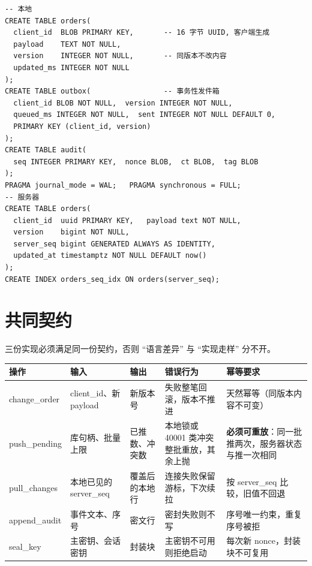 \documentclass[12pt,a4paper,fontset=fandol]{ctexbook}
\begin{document}
\begin{lstlisting}[style=sqlstyle,caption={共享表结构：本地 SQLite 与服务器 PostgreSQL}]
-- 本地
CREATE TABLE orders(
  client_id  BLOB PRIMARY KEY,       -- 16 字节 UUID, 客户端生成
  payload    TEXT NOT NULL,
  version    INTEGER NOT NULL,       -- 同版本不改内容
  updated_ms INTEGER NOT NULL
);
CREATE TABLE outbox(                 -- 事务性发件箱
  client_id BLOB NOT NULL,  version INTEGER NOT NULL,
  queued_ms INTEGER NOT NULL,  sent INTEGER NOT NULL DEFAULT 0,
  PRIMARY KEY (client_id, version)
);
CREATE TABLE audit(
  seq INTEGER PRIMARY KEY,  nonce BLOB,  ct BLOB,  tag BLOB
);
PRAGMA journal_mode = WAL;   PRAGMA synchronous = FULL;
-- 服务器
CREATE TABLE orders(
  client_id  uuid PRIMARY KEY,   payload text NOT NULL,
  version    bigint NOT NULL,
  server_seq bigint GENERATED ALWAYS AS IDENTITY,
  updated_at timestamptz NOT NULL DEFAULT now()
);
CREATE INDEX orders_seq_idx ON orders(server_seq);
\end{lstlisting}

\section{共同契约}

三份实现必须满足同一份契约，否则 ``语言差异'' 与 ``实现走样'' 分不开。

\begin{footnotesize}
\begin{longtable}{@{}>{\raggedright\arraybackslash}p{}
                  >{\raggedright\arraybackslash}p{}
                  >{\raggedright\arraybackslash}p{}
                  >{\raggedright\arraybackslash}p{}
                  >{\raggedright\arraybackslash}p{}@{}}
\toprule
\textbf{操作} & \textbf{输入} & \textbf{输出} & \textbf{错误行为} &
\textbf{幂等要求} \\
\midrule
change\_order & client\_id、新 payload & 新版本号 &
失败整笔回滚，版本不推进 & 天然幂等（同版本内容不可变） \\
push\_pending & 库句柄、批量上限 & 已推数、冲突数 &
本地锁或 40001 类冲突整批重放，其余上抛 &
\textbf{必须可重放}：同一批推两次，服务器状态与推一次相同 \\
pull\_changes & 本地已见的 server\_seq & 覆盖后的本地行 &
连接失败保留游标，下次续拉 & 按 server\_seq 比较，旧值不回退 \\
append\_audit & 事件文本、序号 & 密文行 & 密封失败则不写 &
序号唯一约束，重复序号被拒 \\
seal\_key & 主密钥、会话密钥 & 封装块 & 主密钥不可用则拒绝启动 &
每次新 nonce，封装块不可复用 \\
\bottomrule
\end{longtable}
\end{footnotesize}
\end{document}
